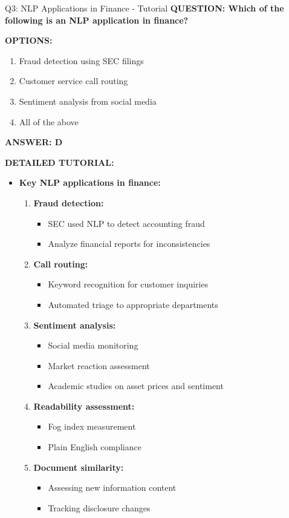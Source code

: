 \documentclass[8pt]{beamer}
\begin{document}
	\begin{frame}{Q3: NLP Applications in Finance - Tutorial}
		\fontsize{6.5}{7.5}\selectfont
		\textbf{QUESTION: Which of the following is an NLP application in finance?}
		
		\vspace{0.1cm}
		\textbf{OPTIONS:}
		\begin{enumerate}
			\item Fraud detection using SEC filings
			\item Customer service call routing
			\item Sentiment analysis from social media
			\item All of the above
		\end{enumerate}
		
		\vspace{0.1cm}
		\textcolor{myblue}{\textbf{ANSWER: D}}
		
		\vspace{0.1cm}
		\textbf{DETAILED TUTORIAL:}
		\begin{itemize}
			\item \textbf{Key NLP applications in finance:}
			\begin{enumerate}
				\item \textbf{Fraud detection:}
				\begin{itemize}
					\item SEC used NLP to detect accounting fraud
					\item Analyze financial reports for inconsistencies
				\end{itemize}
				\item \textbf{Call routing:}
				\begin{itemize}
					\item Keyword recognition for customer inquiries
					\item Automated triage to appropriate departments
				\end{itemize}
				\item \textbf{Sentiment analysis:}
				\begin{itemize}
					\item Social media monitoring
					\item Market reaction assessment
					\item Academic studies on asset prices and sentiment
				\end{itemize}
				\item \textbf{Readability assessment:}
				\begin{itemize}
					\item Fog index measurement
					\item Plain English compliance
				\end{itemize}
				\item \textbf{Document similarity:}
				\begin{itemize}
					\item Assessing new information content
					\item Tracking disclosure changes
				\end{itemize}
			\end{enumerate}
		\end{itemize}
		

\end{frame}
\end{document}
